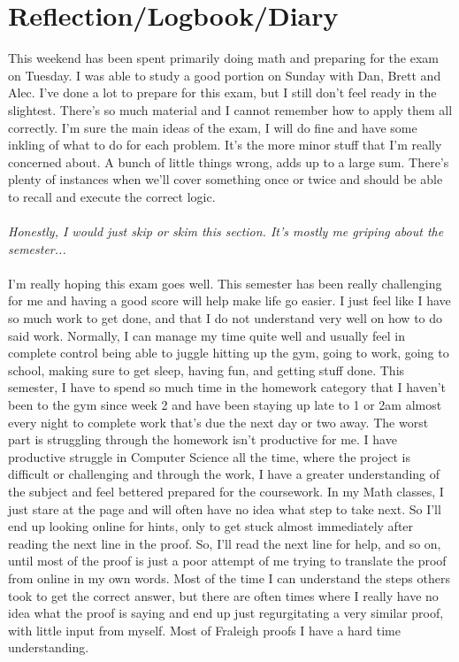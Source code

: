 \documentclass[11pt]{article}
\theoremstyle{plain}
\theoremstyle{definition}
\begin{document}
\section{Reflection/Logbook/Diary}
This weekend has been spent primarily doing math and preparing for the exam on Tuesday. I was able to study a good portion on Sunday with Dan, Brett and Alec. I've done a lot to prepare for this exam, but I still don't feel ready in the slightest. There's so much material and I cannot remember how to apply them all correctly. I'm sure the main ideas of the exam, I will do fine and have some inkling of what to do for each problem. It's the more minor stuff that I'm really concerned about. A bunch of little things wrong, adds up to a large sum. There's plenty of instances when we'll cover something once or twice and should be able to recall and execute the correct logic.\\
\\
\textit{Honestly, I would just skip or skim this section. It's mostly me griping about the semester...}\\
\\
 I'm really hoping this exam goes well. This semester has been really challenging for me and having a good score will help make life go easier. I just feel like I have so much work to get done, and that I do not understand very well on how to do said work. Normally, I can manage my time quite well and usually feel in complete control being able to juggle hitting up the gym, going to work, going to school, making sure to get sleep, having fun, and getting stuff done. This semester, I have to spend so much time in the homework category that I haven't been to the gym since week 2 and have been staying up late to 1 or 2am almost every night to complete work that's due the next day or two away. The worst part is struggling through the homework isn't productive for me. I have productive struggle in Computer Science all the time, where the project is difficult or challenging and through the work, I have a greater understanding of the subject and feel bettered prepared for the coursework. In my Math classes, I just stare at the page and will often have no idea what step to take next. So I'll end up looking online for hints, only to get stuck almost immediately after reading the next line in the proof. So, I'll read the next line for help, and so on, until most of the proof is just a poor attempt of me trying to translate the proof from online in my own words. Most of the time I can understand the steps others took to get the correct answer, but there are often times where I really have no idea what the proof is saying and end up just regurgitating a very similar proof, with little input from myself. Most of Fraleigh proofs I have a hard time understanding. 
\end{document}
